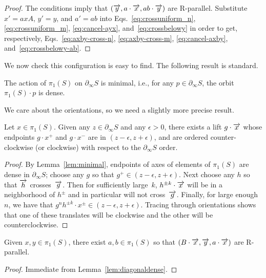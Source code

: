 \begin{proof}
  The conditions imply that
  $(\overrightarrow{y}, a \cdot \overrightarrow{x}, ab \cdot \overrightarrow{y})$ are R-parallel.
  Substitute $x' = axA$, $y'=y$, and $a' = ab$ into
  Eqs.~\eqref{eq:crossuniform_n},
  \eqref{eq:crossuniform_m}, \eqref{eq:cancel-ayx},
  and~\eqref{eq:crossbelowy} in order to get, respectively,
  Eqs.~\eqref{eq:axby-cross-n},
    \eqref{eq:axby-cross-m},
    \eqref{eq:cancel-axby}, and~\eqref{eq:crossbelowy-ab}.
\end{proof}

We now check this configuration is easy to find. The following result
is standard.

\begin{lemma}
The action of $\pi_1(S)$ on $\partial_{\infty} S$ is minimal,
i.e., for any $p \in \partial_{\infty} S$, the orbit
$\pi_1(S)\cdot p$ is dense.
\label{lem:minimal}
\end{lemma}

We care about the orientations, so we need a slightly more precise result.

\begin{lemma}
\label{lem:diagonaldense}
Let $x \in \pi_1(S)$.
Given any $z \in \partial_\infty  S$
and any $\epsilon>0$, there exists a lift $g \cdot \overrightarrow{x}$ whose
endpoints $g\cdot x^+$ and $g\cdot x^-$ are in $(z-\epsilon,z+\epsilon)$, and are ordered counter-clockwise (or clockwise)
with respect to the $\partial_\infty S$ order.
\end{lemma}
\begin{proof}
By Lemma~\ref{lem:minimal}, endpoints of axes of elements of
$\pi_1(S)$ are dense in $\partial_\infty S$; choose any $g$ so that
$g^+ \in (z-\epsilon,z+\epsilon)$. Next choose any $h$ so that
$\overrightarrow{h}$ crosses~$\overrightarrow{g}$. Then for sufficiently large~$k$, $h^{\pm k}\cdot
\overrightarrow{x}$ will be in a neighborhood of $h^{\pm}$ and in particular will
not cross~$\overrightarrow{g}$.
Finally, for large enough $n$, we have
that $g^n h^{\pm k} \cdot x^{\pm} \in (z-\epsilon,z+\epsilon)$.
Tracing through orientations shows that one of these translates will
be clockwise and the other will be counterclockwise.
\end{proof}

\begin{lemma}\label{lem:initial}
  Given $x, y \in \pi_1(S)$, there exist $a,b \in \pi_1(S)$ so that
  $(B \cdot \overrightarrow{x}, \overrightarrow{y}, a \cdot \overrightarrow{x})$ are R-parallel.
\end{lemma}
\begin{proof}
  Immediate from Lemma~\ref{lem:diagonaldense}.
\end{proof}

